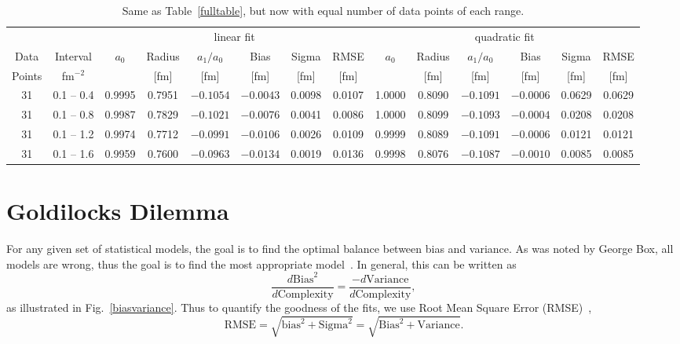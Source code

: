 \documentclass[10pt,superscriptaddress,aps,prc,twocolumn]{revtex4-1}
\begin{document}
\begin{table}
\caption{Same as Table~\ref{fulltable}, but now with equal number of data points of each range.}
\begin{tabular}{cc|cccccc|cccccc} \hline
       &           & \multicolumn{6}{c|}{linear fit}                       & \multicolumn{6}{c}{quadratic fit}                    \\ 
Data   & Interval  & $a_0$ & Radius &  $a_1/a_0$ &  Bias  & Sigma &  RMSE  & $a_0$ & Radius & $a_1/a_0$ &  Bias & Sigma &  RMSE \\  
Points & fm$^{-2}$ &       & [fm]   &   [fm]     & [fm]   &  [fm] &  [fm]  &       & [fm]   &  [fm]     & [fm]  &  [fm] &  [fm] \\  \hline
31& 0.1 -- 0.4 & 0.9995& 0.7951& $-0.1054$& $-0.0043$& 0.0098& 0.0107 & 1.0000& 0.8090& $-0.1091$& $-0.0006$& 0.0629& 0.0629 \\
31& 0.1 -- 0.8 & 0.9987& 0.7829& $-0.1021$& $-0.0076$& 0.0041& 0.0086 & 1.0000& 0.8099& $-0.1093$& $-0.0004$& 0.0208& 0.0208  \\
31& 0.1 -- 1.2 & 0.9974& 0.7712& $-0.0991$& $-0.0106$& 0.0026& 0.0109 & 0.9999& 0.8089& $-0.1091$& $-0.0006$& 0.0121& 0.0121  \\
31& 0.1 -- 1.6 & 0.9959& 0.7600& $-0.0963$& $-0.0134$& 0.0019& 0.0136 & 0.9998& 0.8076& $-0.1087$& $-0.0010$& 0.0085& 0.0085  \\  \hline
\end{tabular}
\label{equaldatatable}
\end{table}



\section{Goldilocks Dilemma}

For any given set of statistical models, the goal is to find the optimal balance between bias and variance.   
As was noted by George Box, all models are wrong, thus the goal is to find the most appropriate model~\cite{Box76}. 
In general, this can be written as
\begin{equation}
\frac{d {\mathrm{Bias}^2 }}{ d {\mathrm{Complexity}}} = \frac{- d {\mathrm{Variance}} }{ d {\mathrm{Complexity}}},
\end{equation}
as illustrated in Fig.~\ref{biasvariance}.
Thus to quantify the goodness of the fits, we use Root Mean Square Error (RMSE)~\cite{Hastie:2009,James:2014},
\begin{equation}
{\mathrm{RMSE}} = \sqrt{ {\mathrm{bias}}^2 + {\mathrm{Sigma}}^2} = \sqrt{{\mathrm{Bias}}^2 + {\mathrm{Variance}}}.
\end{equation}
\end{document}
